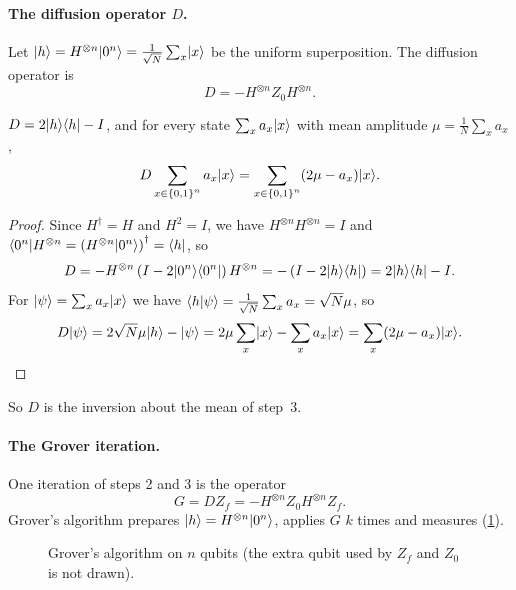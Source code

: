 \paragraph{The diffusion operator $D$.} Let $\lvert h \rangle = H^{\otimes n}\lvert 0^n \rangle = \frac{1}{\sqrt{N}} \sum_{x} \lvert x \rangle$
be the uniform superposition. The diffusion operator is
\[D = -H^{\otimes n} Z_0 H^{\otimes n}.\]

\begin{lemma}\label{lem:diffusion-1006}
    $D = 2\lvert h \rangle\langle h \rvert - I$, and for every state $\sum_{x} a_x \lvert x \rangle$ with mean amplitude
    $\mu = \frac{1}{N} \sum_{x} a_x$,
    \[D \sum_{x \in \left\lbrace0,1\right\rbrace^n} a_x \lvert x \rangle = \sum_{x \in \left\lbrace0,1\right\rbrace^n} (2\mu - a_x) \lvert x \rangle.\]
\end{lemma}

\begin{proof}
    Since $H^\dagger = H$ and $H^2 = I$, we have $H^{\otimes n} H^{\otimes n} = I$ and
    $\langle 0^n \rvert H^{\otimes n} = \left(H^{\otimes n}\lvert 0^n \rangle\right)^\dagger = \langle h \rvert$, so
    \[D = -H^{\otimes n} \left(I - 2\lvert 0^n \rangle\langle 0^n \rvert\right) H^{\otimes n}
        = -\left(I - 2\lvert h \rangle\langle h \rvert\right) = 2\lvert h \rangle\langle h \rvert - I.\]
    For $\lvert \psi \rangle = \sum_x a_x \lvert x \rangle$ we have $\langle h \vert \psi \rangle = \frac{1}{\sqrt{N}} \sum_x a_x = \sqrt{N}\mu$, so
    \[D\lvert \psi \rangle = 2\sqrt{N}\mu \lvert h \rangle - \lvert \psi \rangle = 2\mu \sum_{x} \lvert x \rangle - \sum_{x} a_x \lvert x \rangle = \sum_{x} (2\mu - a_x) \lvert x \rangle. \qedhere\]
\end{proof}

So $D$ is the inversion about the mean of step~3.

\paragraph{The Grover iteration.} One iteration of steps 2 and 3 is the operator
\[G = D Z_f = -H^{\otimes n} Z_0 H^{\otimes n} Z_f.\]
Grover's algorithm prepares $\lvert h \rangle = H^{\otimes n}\lvert 0^n \rangle$, applies $G$ $k$ times and measures
(\cref{fig:grover-circuit-1006}).

\begin{figure}[ht]
    \centering
    \caption{Grover's algorithm on $n$ qubits (the extra qubit used by $Z_f$ and $Z_0$ is not drawn).}
    \label{fig:grover-circuit-1006}
\end{figure}

